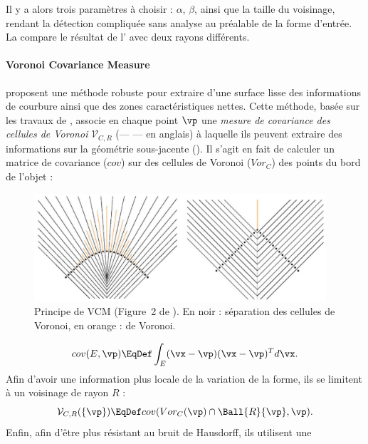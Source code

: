 %
Il y a alors trois paramètres à choisir : $\alpha$, $\beta$, ainsi que la
taille du voisinage, rendant la détection compliquée sans analyse au préalable
de la forme d'entrée. La  compare le résultat de l' avec deux rayons différents.
%
\paragraph{Voronoi Covariance Measure}
%
 proposent une méthode robuste pour extraire
d'une surface lisse des informations de courbure ainsi que des zones
caractéristiques nettes. Cette méthode, basée sur les travaux de
, associe en chaque point $\vp$ une \emph{mesure de
covariance des cellules de Voronoi} $\mathcal{V}_{C,R}$ (\VCMM --- \VCM --- en
anglais) à laquelle ils peuvent extraire des informations sur la géométrie
sous-jacente (). Il s'agit en fait de calculer un matrice de covariance ($cov$) sur des
cellules de Voronoi ($Vor_C$) des points du bord de l'objet :
%
\begin{figure}[ht]{
    \begin{center}
    \includegraphics[height=4cm]{images/Feature/VCM}
    \end{center}}
    \caption[Notations.]{Principe de VCM (Figure~2 de \cite{Merigot2011}). En noir : séparation des cellules de Voronoi, en orange :  de Voronoi.
      \label{fig:mellado-VCM}}
\end{figure}
%
\begin{equation}
    cov(E,\vp) \EqDef \int_E (\vx - \vp)(\vx - \vp)^T d\vx .
\end{equation}
%
Afin d'avoir une information plus locale de la variation de la forme, ils se
limitent à un voisinage de rayon $R$ :
%
\begin{equation}
  \mathcal{V}_{C,R}(\{\vp\}) \EqDef cov(Vor_C(\vp) \cap \Ball{R}{\vp}, \vp) .
\end{equation}
%
Enfin, afin d'être plus résistant au bruit de Hausdorff, ils utilisent une

